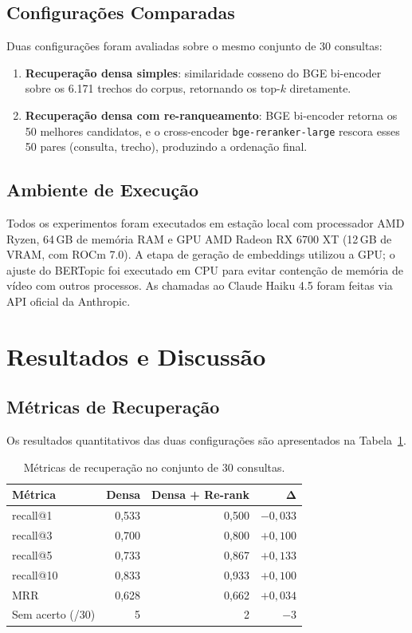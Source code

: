 \documentclass[11pt,a4paper]{article}
\begin{document}
\subsection{Configurações Comparadas}

Duas configurações foram avaliadas sobre o mesmo conjunto de 30 consultas:

\begin{enumerate}
  \item \textbf{Recuperação densa simples}: similaridade cosseno do BGE bi-encoder sobre os 6.171 trechos do corpus, retornando os top-$k$ diretamente.
  \item \textbf{Recuperação densa com re-ranqueamento}: BGE bi-encoder retorna os 50 melhores candidatos, e o cross-encoder \texttt{bge-reranker-large} rescora esses 50 pares (consulta, trecho), produzindo a ordenação final.
\end{enumerate}

\subsection{Ambiente de Execução}

Todos os experimentos foram executados em estação local com processador AMD Ryzen, 64\,GB de memória RAM e GPU AMD Radeon RX 6700 XT (12\,GB de VRAM, com ROCm 7.0). A etapa de geração de embeddings utilizou a GPU; o ajuste do BERTopic foi executado em CPU para evitar contenção de memória de vídeo com outros processos. As chamadas ao Claude Haiku 4.5 foram feitas via API oficial da Anthropic.

\section{Resultados e Discussão}

\subsection{Métricas de Recuperação}

Os resultados quantitativos das duas configurações são apresentados na Tabela~\ref{tab:resultados}.

\begin{table}[!ht]
\caption{Métricas de recuperação no conjunto de 30 consultas.}
\label{tab:resultados}
\centering
\begin{tabular}{l r r r}
\toprule
\textbf{Métrica} & \textbf{Densa} & \textbf{Densa + Re-rank} & $\boldsymbol{\Delta}$ \\
\midrule
recall@1   & 0,533 & 0,500 & $-0{,}033$ \\
recall@3   & 0,700 & 0,800 & $+0{,}100$ \\
recall@5   & 0,733 & 0,867 & $+0{,}133$ \\
recall@10  & 0,833 & 0,933 & $+0{,}100$ \\
MRR        & 0,628 & 0,662 & $+0{,}034$ \\
Sem acerto (/30) & 5 & 2 & $-3$ \\
\bottomrule
\end{tabular}
\end{table}
\end{document}
